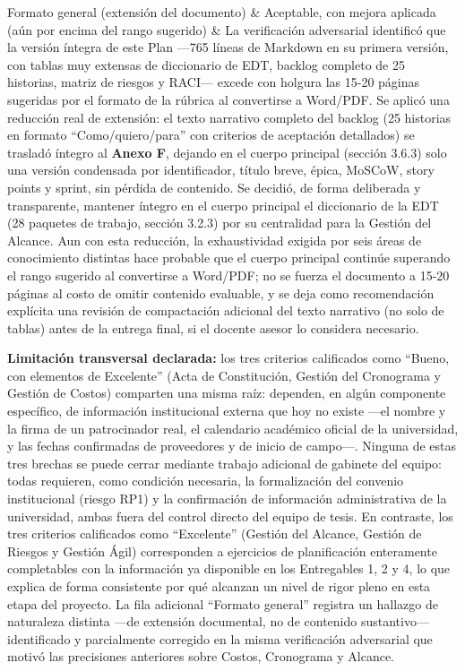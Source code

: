 \documentclass[11pt,a4paper]{article}
\begin{document}
{\begin{longtable}[]
Formato general (extensión del documento) & Aceptable, con mejora aplicada (aún por encima del rango sugerido) & La verificación adversarial identificó que la versión íntegra de este Plan ---765 líneas de Markdown en su primera versión, con tablas muy extensas de diccionario de EDT, backlog completo de 25 historias, matriz de riesgos y RACI--- excede con holgura las 15-20 páginas sugeridas por el formato de la rúbrica al convertirse a Word/PDF. Se aplicó una reducción real de extensión: el texto narrativo completo del backlog (25 historias en formato ``Como/quiero/para'' con criterios de aceptación detallados) se trasladó íntegro al \textbf{Anexo F}, dejando en el cuerpo principal (sección 3.6.3) solo una versión condensada por identificador, título breve, épica, MoSCoW, story points y sprint, sin pérdida de contenido. Se decidió, de forma deliberada y transparente, mantener íntegro en el cuerpo principal el diccionario de la EDT (28 paquetes de trabajo, sección 3.2.3) por su centralidad para la Gestión del Alcance. Aun con esta reducción, la exhaustividad exigida por seis áreas de conocimiento distintas hace probable que el cuerpo principal continúe superando el rango sugerido al convertirse a Word/PDF; no se fuerza el documento a 15-20 páginas al costo de omitir contenido evaluable, y se deja como recomendación explícita una revisión de compactación adicional del texto narrativo (no solo de tablas) antes de la entrega final, si el docente asesor lo considera necesario. \\
\end{longtable}
}

\textbf{Limitación transversal declarada:} los tres criterios calificados como ``Bueno, con elementos de Excelente'' (Acta de Constitución, Gestión del Cronograma y Gestión de Costos) comparten una misma raíz: dependen, en algún componente específico, de información institucional externa que hoy no existe ---el nombre y la firma de un patrocinador real, el calendario académico oficial de la universidad, y las fechas confirmadas de proveedores y de inicio de campo---. Ninguna de estas tres brechas se puede cerrar mediante trabajo adicional de gabinete del equipo: todas requieren, como condición necesaria, la formalización del convenio institucional (riesgo RP1) y la confirmación de información administrativa de la universidad, ambas fuera del control directo del equipo de tesis. En contraste, los tres criterios calificados como ``Excelente'' (Gestión del Alcance, Gestión de Riesgos y Gestión Ágil) corresponden a ejercicios de planificación enteramente completables con la información ya disponible en los Entregables 1, 2 y 4, lo que explica de forma consistente por qué alcanzan un nivel de rigor pleno en esta etapa del proyecto. La fila adicional ``Formato general'' registra un hallazgo de naturaleza distinta ---de extensión documental, no de contenido sustantivo--- identificado y parcialmente corregido en la misma verificación adversarial que motivó las precisiones anteriores sobre Costos, Cronograma y Alcance.
\end{document}
